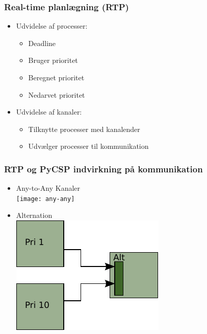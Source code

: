 \documentclass[12pt]{beamer}
\begin{document}
\begin{frame}
  \frametitle{Real-time planlægning (RTP)}
  \begin{itemize}
	\item Udvidelse af processer:
	  \begin{itemize}   
		\item Deadline
		\item Bruger prioritet
		\item Beregnet prioritet	
		\item Nedarvet prioritet
	  \end{itemize}
	\item Udvidelse af kanaler:
	  \begin{itemize}   
		\item Tilknytte processer med kanalender
		\item Udvælger processer til kommunikation
	  \end{itemize}
\end{itemize}
\end{frame}


\begin{frame}
	\frametitle{RTP og PyCSP indvirkning på kommunikation}
	\begin{itemize}
		\item Any-to-Any Kanaler\\
			\vspace{0,5cm}
			\texttt{[image: any-any]} 
	 	\item Alternation\\
			\vspace{0,5cm}
			\includegraphics[scale=0.7]{alt-inheritance} 
	\end{itemize} 
\end{frame} 
\end{document}
